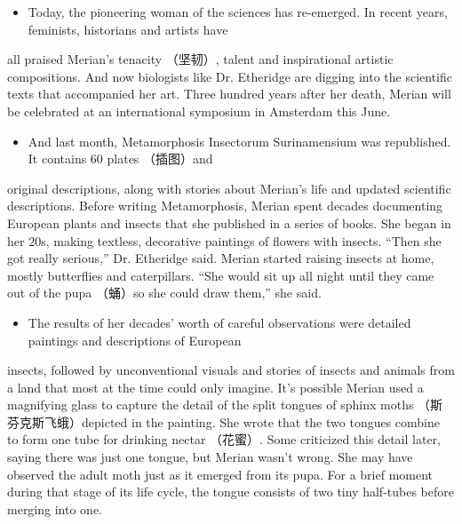 \documentclass[UTF8,11pt]{ctexart}
\begin{document}
\begin{itemize}[leftmargin=2em,itemsep=.2em,topsep=.4em]\item[F.] Today, the pioneering woman of the sciences has re-emerged. In recent years, feminists, historians and artists have
\end{itemize}

all praised Merian's tenacity （坚韧）, talent and inspirational artistic compositions. And now biologists like Dr. Etheridge are digging into the scientific texts that accompanied her art. Three hundred years after her death, Merian will be celebrated at an international symposium in Amsterdam this June.


\begin{itemize}[leftmargin=2em,itemsep=.2em,topsep=.4em]\item[G.] And last month, Metamorphosis Insectorum Surinamensium was republished. It contains 60 plates （插图）and
\end{itemize}

original descriptions, along with stories about Merian's life and updated scientific descriptions. Before writing Metamorphosis, Merian spent decades documenting European plants and insects that she published in a series of books. She began in her 20s, making textless, decorative paintings of flowers with insects. “Then she got really serious,” Dr. Etheridge said. Merian started raising insects at home, mostly butterflies and caterpillars. “She would sit up all night until they came out of the pupa （蛹）so she could draw them,” she said.


\begin{itemize}[leftmargin=2em,itemsep=.2em,topsep=.4em]\item[H.] The results of her decades' worth of careful observations were detailed paintings and descriptions of European
\end{itemize}

insects, followed by unconventional visuals and stories of insects and animals from a land that most at the time could only imagine. It's possible Merian used a magnifying glass to capture the detail of the split tongues of sphinx moths （斯芬克斯飞蛾）depicted in the painting. She wrote that the two tongues combine to form one tube for drinking nectar （花蜜）. Some criticized this detail later, saying there was just one tongue, but Merian wasn't wrong. She may have observed the adult moth just as it emerged from its pupa. For a brief moment during that stage of its life cycle, the tongue consists of two tiny half-tubes before merging into one.
\end{document}
